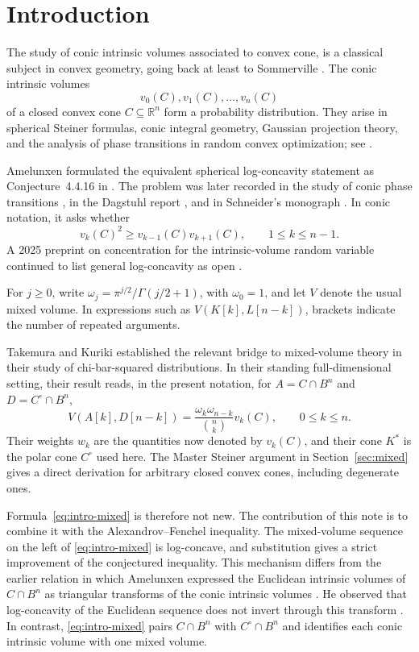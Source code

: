 \documentclass[12pt,a4paper]{article}
\numberwithin{equation}{section}
\theoremstyle{definition}
\theoremstyle{remark}
\newcommand{\R}{\mathbb{R}}
\begin{document}
\section{Introduction}
The study of conic intrinsic volumes associated to convex cone, is a classical subject in convex geometry, going back at least to Sommerville \cite{Sommerville}. The conic intrinsic volumes
\[
 v_0(C),v_1(C),\ldots,v_n(C)
\]
of a closed convex cone $C\subseteq\R^n$ form a probability
distribution.  They arise in spherical Steiner formulas, conic
integral geometry, Gaussian projection theory, and the analysis of
phase transitions in random convex optimization; see
\cite{AmelunxenLotz,ALMT,McCoyTropp,SchneiderWeil}.

Amelunxen formulated the equivalent spherical log-concavity statement
as Conjecture~4.4.16 in \cite{AmelunxenThesis}.  The problem was later
recorded in the study of conic phase transitions
\cite[Section~6.1]{ALMT}, in the Dagstuhl report
\cite[Section~5.4]{AmelunxenDagstuhl}, and in Schneider's monograph
\cite[Section 4.5]{SchneiderCones}.  In conic notation, it asks whether
\[
 v_k(C)^2\ge v_{k-1}(C)v_{k+1}(C),
 \qquad 1\le k\le n-1.
\]
A 2025 preprint on concentration for the intrinsic-volume random
variable continued to list general log-concavity as open
\cite[Section~6]{FernandezMelbournePalafox}.

For $j\ge0$, write $\omega_j=\pi^{j/2}/\Gamma(j/2+1)$, with $\omega_0=1$, and let $V$ denote the usual mixed volume.  In expressions such as
$V(K[k],L[n-k])$, brackets indicate the number of repeated arguments.

Takemura and Kuriki established the relevant bridge to mixed-volume
theory in their study of chi-bar-squared distributions.  In their
standing full-dimensional setting, their result
\cite[Theorem~2.1]{TakemuraKuriki} reads, in the present notation, for
$A=C\cap B^n$ and $D=C^\circ\cap B^n$,
\begin{equation}\label{eq:intro-mixed}
 V(A[k],D[n-k])
 =\frac{\omega_k\omega_{n-k}}{\binom nk}v_k(C),
 \qquad 0\le k\le n.
\end{equation}
Their weights $w_k$ are the quantities now denoted by $v_k(C)$, and
their cone $K^*$ is the polar cone $C^\circ$ used here.  The
Master Steiner argument in Section~\ref{sec:mixed} gives a direct
derivation for arbitrary closed convex cones, including degenerate
ones.

Formula~\eqref{eq:intro-mixed} is therefore not new.  The contribution
of this note is to combine it with the Alexandrov--Fenchel inequality.
The mixed-volume sequence on the left of \eqref{eq:intro-mixed} is
log-concave, and substitution gives a strict improvement of the
conjectured inequality.  This mechanism differs from the earlier
relation in which Amelunxen expressed the Euclidean intrinsic volumes
of $C\cap B^n$ as triangular transforms of the conic intrinsic volumes
\cite[Proposition~4.4.18]{AmelunxenThesis}.  He observed that
log-concavity of the Euclidean sequence does not invert through this
transform \cite[Remarks~4.4.19--4.4.20]{AmelunxenThesis}.  In
contrast, \eqref{eq:intro-mixed} pairs $C\cap B^n$ with
$C^\circ\cap B^n$ and identifies each conic intrinsic volume with one
mixed volume.
\end{document}
